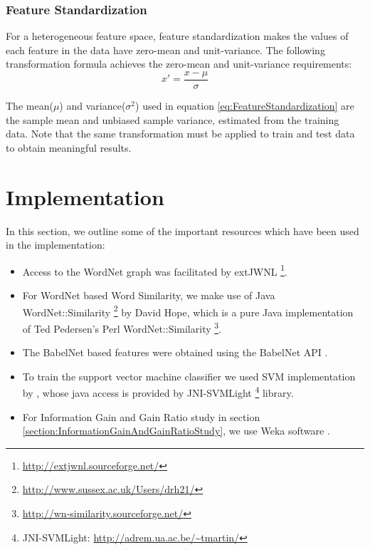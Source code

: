 \subsubsection{Feature Standardization}
For a heterogeneous feature space, feature standardization makes the values of each feature in the data have zero-mean and unit-variance. The following transformation formula achieves the zero-mean and unit-variance requirements:
\begin{equation}
\label{eq:FeatureStandardization}
x' = \frac{x-\mu}{\sigma}
\end{equation}

The mean($\mu$) and variance($\sigma^2$) used in equation \ref{eq:FeatureStandardization} are the sample mean and unbiased sample variance, estimated from the training data. Note that the same transformation must be applied to train and test data to obtain meaningful results.

\section{Implementation}
In this section, we outline some of the important resources which have been used in the implementation: 
\begin{itemize}
\item Access to the WordNet graph was facilitated by extJWNL \footnote{\url{http://extjwnl.sourceforge.net/}}.

\item For WordNet based Word Similarity, we make use of Java WordNet::Similarity \footnote{\url{http://www.sussex.ac.uk/Users/drh21/}} by David Hope, which is a pure Java implementation of Ted Pedersen's Perl WordNet::Similarity \footnote{\url{http://wn-similarity.sourceforge.net/}}.

\item The BabelNet based features were obtained using the BabelNet API \citep{NavigliPonzetto:2012acl}.

\item To train the support vector machine classifier we used SVM implementation by \citep{Joachims98makinglarge-scale}, whose java access is provided by JNI-SVMLight \footnote{JNI-SVMLight: \url{http://adrem.ua.ac.be/~tmartin/}} library.

\item For Information Gain and Gain Ratio study in section \ref{section:InformationGainAndGainRatioStudy}, we use Weka software \citep{wekaSoftware}.
\end{itemize}

